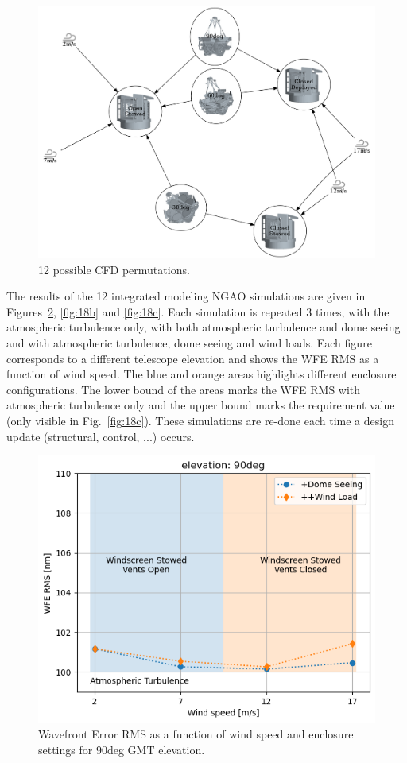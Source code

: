 \documentclass[]{AO4ELT}  %
\begin{document}
\begin{figure}
   \centering
   \includegraphics[width=\linewidth]{cfd_cases_tr.dot.png}
   \caption{12 possible CFD permutations.}
   \label{fig:17}
\end{figure}

The results of the 12 integrated modeling NGAO simulations are given in Figures~\ref{fig:18a}, \ref{fig:18b} and \ref{fig:18c}.
Each simulation is repeated 3 times, with the atmospheric turbulence only, with both atmospheric turbulence and dome seeing and with atmospheric turbulence, dome seeing and wind loads.
Each figure corresponds to a different telescope elevation and shows the WFE RMS as a function of wind speed.
The blue and orange areas highlights different enclosure configurations.
The lower bound of the areas marks the WFE RMS with atmospheric turbulence only and the upper bound marks the requirement value (only visible in Fig.~\ref{fig:18c}).
These simulations are re-done each time a design update (structural, control, ...) occurs.

\begin{figure}
   \centering
   \includegraphics[width=0.5\linewidth]{wfe-rms_el90.png}
   \caption{Wavefront Error RMS as a function of wind speed and enclosure settings for 90deg GMT elevation.}
   \label{fig:18a}
\end{figure}
\end{document}
